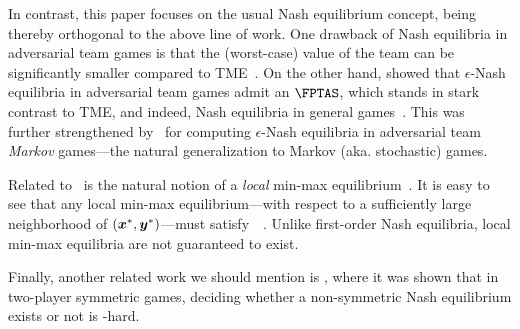 In contrast, this paper focuses on the usual Nash equilibrium concept, being thereby orthogonal to the above line of work. One drawback of Nash equilibria in adversarial team games is that the (worst-case) value of the team can be significantly smaller compared to TME~\citep{Basilico17:Team}. On the other hand, \citet{Anagnostides23:Algorithms} showed that $\epsilon$-Nash equilibria in adversarial team games admit an $\FPTAS$, which stands in stark contrast to TME, and indeed, Nash equilibria in general games~\citep{Daskalakis09:The,Chen09:Settling}. This was further strengthened by~\citet{kalogiannis2022efficiently,Kalogiannis24:Learning} for computing $\epsilon$-Nash equilibria in adversarial team \emph{Markov} games---the natural generalization to Markov (aka. stochastic) games.

Related to~ is the natural notion of a \emph{local} min-max equilibrium~\citep{DP18, DSZ21}. It is easy to see that any local min-max equilibrium---with respect to a sufficiently large neighborhood of $({\bm{x}}^*, {\bm{y}}^*)$---must satisfy~~\citep{DSZ21}. Unlike first-order Nash equilibria, local min-max equilibria are not guaranteed to exist.

Finally, another related work we should mention is \cite{mehta2015settling}, where it was shown that in two-player symmetric games, deciding whether a non-symmetric Nash equilibrium exists or not is \NP-hard. 
